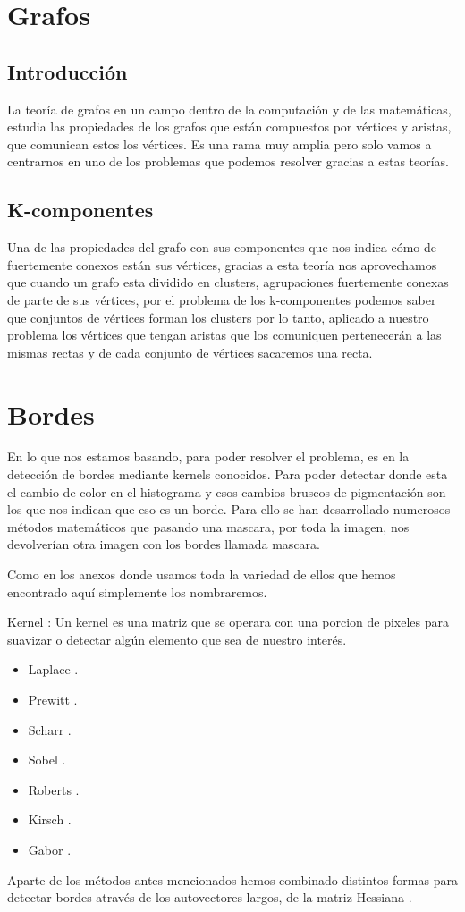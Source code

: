 \section{Grafos}	
\subsection{Introducción}
La teoría de grafos\cite{Wiki:Grafos} en un campo dentro de la computación y de las matemáticas, estudia las propiedades de los grafos que están compuestos por vértices y aristas, que comunican estos los vértices.
Es una rama muy amplia pero solo vamos a centrarnos en uno de los problemas que podemos resolver gracias a estas teorías.

\subsection{K-componentes}
Una de las propiedades del grafo con sus componentes que nos indica cómo de fuertemente conexos están sus vértices, gracias a esta teoría nos aprovechamos que cuando un grafo esta dividido en clusters, agrupaciones fuertemente conexas de parte de sus vértices, por el problema de los k-componentes podemos saber que conjuntos de vértices forman los clusters por lo tanto, aplicado a nuestro problema los vértices que tengan aristas que los comuniquen pertenecerán a las mismas rectas y de cada conjunto de vértices sacaremos una recta.

\section{Bordes}
En lo que nos estamos basando, para poder resolver el problema,
es en la detección de bordes mediante kernels conocidos.
Para poder detectar donde esta el cambio de color en el histograma y esos cambios bruscos de pigmentación son los que nos indican que eso es un borde.
Para ello se han desarrollado numerosos métodos matemáticos que pasando una mascara, por toda la imagen, nos devolverían otra imagen con los bordes llamada mascara.

Como en los anexos donde usamos toda la variedad de ellos que hemos encontrado aquí simplemente los nombraremos.

Kernel \cite{wiki:kernels}: Un kernel es una matriz que se operara con una porcion de pixeles para suavizar o detectar algún elemento que sea de nuestro interés.

\begin{itemize}
\item Laplace \cite{wiki:Laplace}.
\item Prewitt \cite{wiki:Prewitt}.
\item Scharr \cite{jon:Scharr}.
\item Sobel \cite{wiki:Sobel}.
\item Roberts \cite{wiki:Roberts}.
\item Kirsch \cite{wiki:Kirsch}.
\item Gabor \cite{wiki:Gabor}.
\end{itemize}
Aparte de los métodos antes mencionados hemos combinado distintos formas para detectar bordes através de los autovectores \cite{wiki:Eigenvector} largos, de la matriz Hessiana \cite{wiki:Hessiana}.